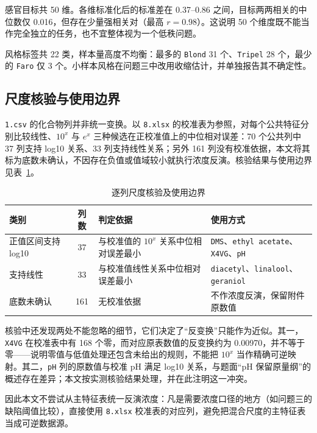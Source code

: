 \documentclass[UTF8,a4paper,zihao=-4]{ctexart}
\numberwithin{figure}{section}
\numberwithin{table}{section}
\numberwithin{equation}{section}
\newcommand{\file}[1]{\texttt{#1}}
\begin{document}
感官目标共 50 维。各维标准化后的标准差在 0.37--0.86 之间，目标两两相关的中位数仅 0.016，但存在少量强相关对（最高 $r=0.98$）。这说明 50 个维度既不能当作完全独立的任务，也不宜整体视为一个低秩问题。

风格标签共 22 类，样本量高度不均衡：最多的 \file{Blond} 31 个、\file{Tripel} 28 个，最少的 \file{Faro} 仅 3 个。小样本风格在问题三中改用收缩估计，并单独报告其不确定性。

\subsection{尺度核验与使用边界}
\label{sec:scale}

\file{1.csv} 的化合物列并非统一变换。以 \file{8.xlsx} 的校准表为参照，对每个公共特征分别比较线性、$10^{x}$ 与 $e^{x}$ 三种候选在正校准值上的中位相对误差：70 个公共列中 37 列支持 log10 关系、33 列支持线性关系；另外 161 列没有校准依据，本文将其标为底数未确认，不因存在负值或值域较小就执行浓度反演。核验结果与使用边界见表~\ref{tab:transform}。

\begin{table}[H]
  \centering
  \caption{逐列尺度核验及使用边界}
  \label{tab:transform}
  \small
  \begin{tabularx}{\textwidth}{@{}l c >{\hsize=1.15\hsize\raggedright\arraybackslash}X >{\hsize=0.85\hsize\raggedright\arraybackslash}X@{}}
    \toprule
    类别 & 列数 & 判定依据 & 使用方式 \\
    \midrule
    正值区间支持 log10 & 37 & 与校准值的 $10^{x}$ 关系中位相对误差最小 & \file{DMS}、\file{ethyl acetate}、\file{X4VG}、\file{pH} \\
    支持线性 & 33 & 与校准值线性关系中位相对误差最小 & \file{diacetyl}、\file{linalool}、\file{geraniol} \\
    底数未确认 & 161 & 无校准依据 & 不作浓度反演，保留附件原数值 \\
    \bottomrule
  \end{tabularx}
\end{table}

核验中还发现两处不能忽略的细节，它们决定了“反变换”只能作为近似。其一，\file{X4VG} 在校准表中有 168 个零，而对应原表数值的反变换约为 0.00970，并不等于零——说明零值与低值处理还包含未给出的规则，不能把 $10^{x}$ 当作精确可逆映射。其二，\file{pH} 列的原数值与校准 pH 满足 log10 关系，与题面“pH 保留原量纲”的概述存在差异；本文按实测核验结果处理，并在此注明这一冲突。

因此本文不尝试从主特征表统一反演浓度：凡是需要浓度口径的地方（如问题三的缺陷阈值比较），直接使用 \file{8.xlsx} 校准表的对应列，避免把混合尺度的主特征表当成可逆数据源。
\end{document}
